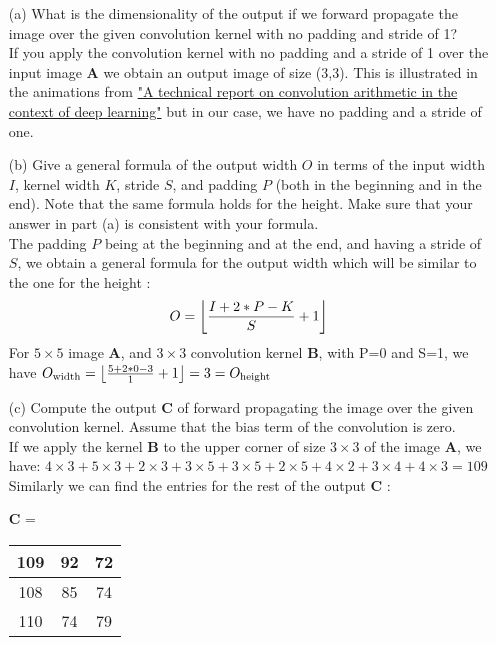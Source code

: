 \documentclass[11pt]{article}
\DeclarePairedDelimiter\floor{\lfloor}{\rfloor}
\newcommand{\0}{\mat{0}}
\newcommand{\matr}[1]{\bm{#1}}     %
\begin{document}
\begin{itemize}
    \item[(a)] What is the dimensionality of the output if we forward propagate the image over the given convolution kernel with no padding and stride of 1? \\
    
     \smallskip
    If you apply the convolution kernel with no padding and a stride of 1 over the input image  $\matr{A}$ we obtain an output image of size (3,3).
    This is illustrated in the animations  from \href{https://github.com/vdumoulin/conv_arithmetic} {"A technical report on convolution arithmetic in the context of deep learning"}
    but in our case, we have no padding and a stride of one.
    
    \item[(b)] Give a general formula of the output width $O$ in terms of the input width $I$, kernel width $K$, stride $S$, and padding $P$ (both in the beginning and in the end). Note that the same formula holds for the height. Make sure that your answer in part (a) is consistent with your formula. \\
    
    \smallskip
    The padding $P$ being at the beginning and at the end, and having a stride of $S$, we obtain a general formula for the output width which will be similar to the one for the height :
    \[
    	O  = \floor*{\frac{I + 2 * P - K}{S} + 1}
    \]
    For   $5\times 5$ image $\matr{A}$, and $3\times 3$  convolution kernel $\matr{B}$, with P=0 and S=1, we have $O_{\text{width}} =  \floor*{\frac{5 + 2 * 0 - 3}{1}  + 1} = 3 = O_{\text{height}}$
    
    \item[(c)] Compute the output $\matr{C}$ of forward propagating the image over the
given convolution kernel. Assume that the bias term of the convolution is zero.\\

	\smallskip
	If we apply the kernel $\matr{B}$ to the upper corner of size   $3\times 3$ of the image $\matr{A}$, we have: 
	$4 \times 3 + 5 \times 3 + 2 \times 3 + 3 \times 5 +  3 \times 5 + 2 \times 5 + 4 \times 2 + 3 \times 4 + 4 \times 3 = 109$
	Similarly we can find the entries for the rest of the output $\matr{C}$ :

	    \begin{table}[!ht]
		    \centering
    		$\matr{C}$ = \begin{tabular}{|c|c|c|} 
    			\hline
			    109 & 92 & 72 \\ \hline 
		        108 & 85 & 74 \\ \hline
       			110 & 74 & 79 \\ \hline 
   		 \end{tabular}
    	  \end{table}


\end{itemize}
\end{document}
